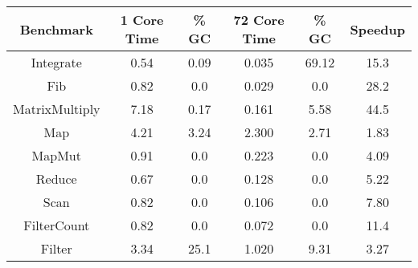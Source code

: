 \documentclass{article}
\begin{document}
\begin{tabular}{c c c c c c}
Benchmark & 1 Core Time & \% GC & 72 Core Time & \% GC & Speedup \\
\hline
Integrate      & 0.54 & 0.09   & 0.035 & 69.12  & 15.3 \\
Fib            & 0.82 & 0.0    & 0.029 & 0.0    & 28.2 \\
MatrixMultiply & 7.18 & 0.17   & 0.161 & 5.58   & 44.5 \\
Map            & 4.21 & 3.24   & 2.300 & 2.71   & 1.83 \\
MapMut         & 0.91 & 0.0    & 0.223 & 0.0    & 4.09 \\ 
Reduce         & 0.67 & 0.0    & 0.128 & 0.0    & 5.22 \\ 
Scan           & 0.82 & 0.0    & 0.106 & 0.0    & 7.80 \\
FilterCount    & 0.82 & 0.0    & 0.072 & 0.0    & 11.4 \\
Filter         & 3.34 & 25.1   & 1.020 & 9.31   & 3.27 \\
\end{tabular}
\end{document}
